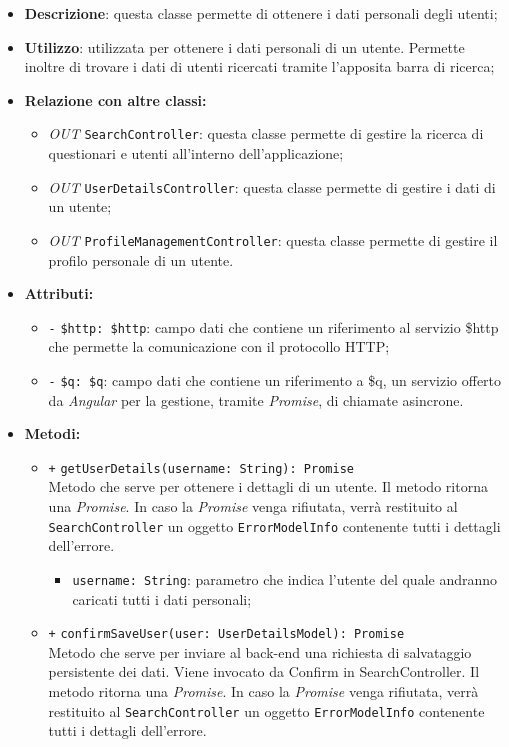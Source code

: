 \begin{itemize}
	\item \textbf{Descrizione}: questa classe permette di ottenere i dati personali degli utenti;
	\item \textbf{Utilizzo}: utilizzata per ottenere i dati personali di un utente. Permette inoltre di trovare i dati di utenti ricercati tramite l'apposita barra di ricerca;
	\item \textbf{Relazione con altre classi:}
	\begin{itemize}
		\item \textit{OUT} \texttt{SearchController}: questa classe permette di gestire la ricerca di questionari e utenti all'interno dell'applicazione;
		\item \textit{OUT} \texttt{UserDetailsController}: questa classe permette di gestire i dati di un utente;
		\item \textit{OUT} \texttt{ProfileManagementController}: questa classe permette di gestire il profilo personale di un utente. 
	\end{itemize}
	\item \textbf{Attributi:}
	\begin{itemize}
		\item \texttt{-} \texttt{\$http: \$http}: campo dati che contiene un riferimento al servizio \$http che permette la comunicazione con il protocollo HTTP;
		\item \texttt{-} \texttt{\$q: \$q}: campo dati che contiene un riferimento a \$q, un servizio offerto da \textit{Angular} per la gestione, tramite \textit{Promise}, di chiamate asincrone.
	\end{itemize}
	\item \textbf{Metodi:}
	\begin{itemize}
		\item \texttt{+} \texttt{getUserDetails(username: String): Promise} \\ Metodo che serve per ottenere i dettagli di un utente. Il metodo ritorna una \textit{Promise}. In caso la \textit{Promise} venga rifiutata, verrà restituito al \texttt{SearchController} un oggetto \texttt{ErrorModelInfo} contenente tutti i dettagli dell'errore. \\
		\begin{itemize}
			\item \texttt{username: String}: parametro che indica l'utente del quale andranno caricati tutti i dati personali;
		\end{itemize}
		\item \texttt{+} \texttt{confirmSaveUser(user: UserDetailsModel): Promise} \\Metodo che serve per inviare al back-end una richiesta di salvataggio persistente dei dati. Viene invocato da Confirm in SearchController. Il metodo ritorna una \textit{Promise}. In caso la \textit{Promise} venga rifiutata, verrà restituito al \texttt{SearchController} un oggetto \texttt{ErrorModelInfo} contenente tutti i dettagli dell'errore. \\

\end{itemize}
\end{itemize}
